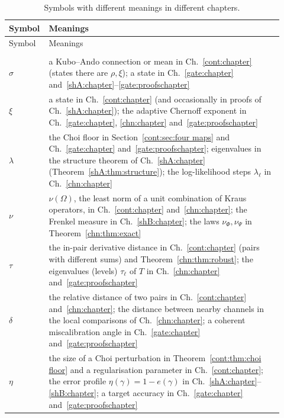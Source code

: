 {\footnotesize
\setlength{\tabcolsep}{4pt}
\renewcommand{\arraystretch}{1.2}
\begin{longtable}{>{\raggedright\arraybackslash}p{0.09\linewidth}>{\raggedright\arraybackslash}p{0.83\linewidth}}
\caption{Symbols with different meanings in different chapters.}\label{nt:tab:collisions}\\
\toprule
Symbol & Meanings\\
\midrule
\endfirsthead
\toprule
Symbol & Meanings\\
\midrule
\endhead
\midrule
\multicolumn{2}{r}{\emph{continued on the next page}}\\
\endfoot
\bottomrule
\endlastfoot
$\sigma$ & a Kubo--Ando connection or mean in Ch.~\ref{cont:chapter} (states there are $\rho,\xi$); a state in Ch.~\ref{gate:chapter} and~\ref{shA:chapter}--\ref{gate:proofschapter}\\
$\xi$ & a state in Ch.~\ref{cont:chapter} (and occasionally in proofs of Ch.~\ref{shA:chapter}); the adaptive Chernoff exponent in Ch.~\ref{gate:chapter}, \ref{chn:chapter} and~\ref{gate:proofschapter}\\
$\lambda$ & the Choi floor in Section~\ref{cont:sec:four maps} and Ch.~\ref{gate:chapter} and~\ref{gate:proofschapter}; eigenvalues in the structure theorem of Ch.~\ref{shA:chapter} (Theorem~\ref{shA:thm:structure}); the log-likelihood steps $\lambda_\ell$ in Ch.~\ref{chn:chapter}\\
$\nu$ & $\nu(\Omega)$, the least norm of a unit combination of Kraus operators, in Ch.~\ref{cont:chapter} and~\ref{chn:chapter}; the Frenkel measure in Ch.~\ref{shB:chapter}; the laws $\nu_\Phi,\nu_\Psi$ in Theorem~\ref{chn:thm:exact}\\
$\tau$ & the in-pair derivative distance in Ch.~\ref{cont:chapter} (pairs with different sums) and Theorem~\ref{chn:thm:robust}; the eigenvalues (levels) $\tau_\ell$ of $T$ in Ch.~\ref{chn:chapter} and~\ref{gate:proofschapter}\\
$\delta$ & the relative distance of two pairs in Ch.~\ref{cont:chapter} and~\ref{chn:chapter}; the distance between nearby channels in the local comparisons of Ch.~\ref{chn:chapter}; a coherent miscalibration angle in Ch.~\ref{gate:chapter} and~\ref{gate:proofschapter}\\
$\eta$ & the size of a Choi perturbation in Theorem~\ref{cont:thm:choi floor} and a regularisation parameter in Ch.~\ref{cont:chapter}; the error profile $\eta(\gamma)=1-e(\gamma)$ in Ch.~\ref{shA:chapter}--\ref{shB:chapter}; a target accuracy in Ch.~\ref{gate:chapter} and~\ref{gate:proofschapter}\\

\end{longtable}}

